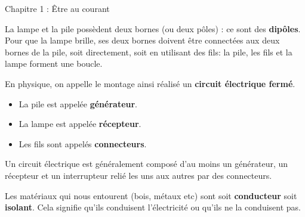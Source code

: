 \documentclass[24pt]{article}
\newcommand{\titre}{Chapitre 1 : Être au courant} %
\begin{document}
\thispagestyle{fancy}
\cfoot{}

\begin{titlebox}{\titre}
    \setlength\parindent{4pt} %
    \setlength\parskip{5pt} 

    La lampe et la pile possèdent deux bornes (ou deux pôles) : ce sont des \textbf{\color{DarkRed} {dipôles}}. Pour que la lampe brille, ses deux
    bornes doivent être connectées aux deux bornes de la pile, soit directement, soit en utilisant des fils: la pile, les fils et
    la lampe forment une boucle. 
    
    En physique, on appelle le montage ainsi réalisé un \textbf{\color{DarkRed} {circuit électrique fermé}}.

    \begin{itemize}
        \item La pile est appelée \textbf{\color{DarkRed} {générateur}}.
        \item La lampe est appelée \textbf{\color{DarkRed} {récepteur}}.
        \item Les fils sont appelés \textbf{\color{DarkRed} {connecteurs}}.
    \end{itemize}

    Un circuit électrique est généralement composé d’au moins un
    générateur, un récepteur et un interrupteur relié les uns
    aux autres par des connecteurs.
    
    \vspace{50pt}

    Les matériaux qui nous entourent (bois, métaux etc) sont soit \textbf{\color{DarkRed} {conducteur}} soit \textbf{\color{DarkRed} {isolant}}.
    Cela signifie qu'ils conduisent l'électricité ou qu'ils ne la conduisent pas.






\end{titlebox}
\end{document}
